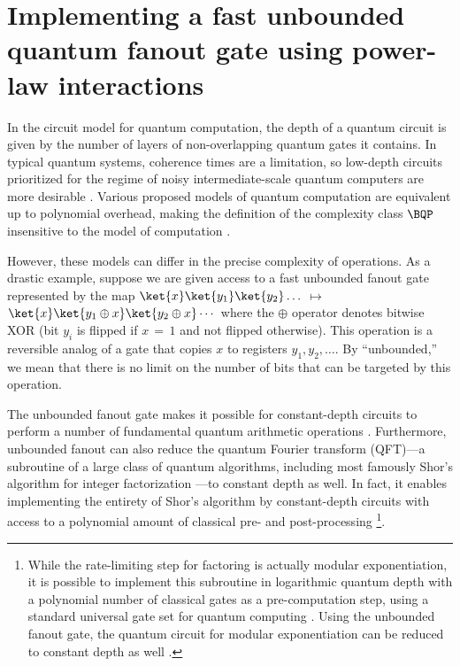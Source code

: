 \chapter{Implementing a fast unbounded quantum fanout gate using power-law interactions}
\label{ch:qfo}
In the circuit model for quantum computation, the depth of a quantum circuit is given by the number of layers of non-overlapping quantum gates it contains.
In typical quantum systems, coherence times are a limitation, so low-depth circuits prioritized for the regime of noisy intermediate-scale quantum computers are more desirable \cite{Preskill2018}.
Various proposed models of quantum computation are equivalent up to polynomial overhead, making the definition of the complexity class $\BQP$ insensitive to the model of computation \cite{Bernstein1993,Raussendorf2001,Raussendorf2003,Hoyer2005}.

However, these models can differ in the precise complexity of operations.
As a drastic example, suppose we are given access to a fast unbounded fanout gate
represented by the map
$\ket{x} \ket{y_1} \ket{y_2} \dots$\,$\mapsto$\,$\ket{x}\ket{y_1 \oplus x} \ket{y_2 \oplus x} \cdots$
where the $\oplus$ operator denotes bitwise XOR (bit $y_i$ is flipped if $x$\,$=$\,$1$ and not flipped otherwise). This operation is a reversible analog of a gate that copies $x$ to registers $y_1, y_2, \dots$.
By ``unbounded,'' we mean that there is no limit on the number of bits that can be targeted by this operation.

The unbounded fanout gate makes it possible for constant-depth circuits to perform a number of fundamental quantum arithmetic operations \cite{Hoyer2005}.
Furthermore, unbounded fanout can also reduce the quantum Fourier transform (QFT)---a subroutine of a large class of quantum algorithms, including most famously Shor’s algorithm for integer factorization \cite{Shor1997}---to constant depth as well.
In fact, it enables implementing the entirety of Shor's algorithm by constant-depth circuits with access to a polynomial amount of classical pre- and post-processing \footnote{While the rate-limiting step for factoring is actually modular exponentiation, it is possible to implement this subroutine in logarithmic quantum depth with a polynomial number of classical gates as a pre-computation step, using a standard universal gate set for quantum computing \cite{Cleve2000}. Using the unbounded fanout gate, the quantum circuit for modular exponentiation can be reduced to constant depth as well \cite{Hoyer2005}.}.

